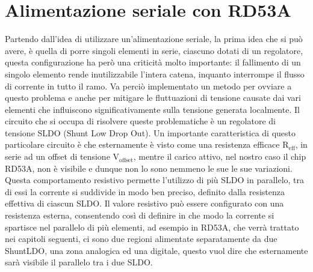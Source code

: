 \section{Alimentazione seriale con RD53A}
Partendo dall'idea di utilizzare un'alimentazione seriale, la prima idea che si può avere, è quella di porre singoli elementi in serie, ciascuno dotati di un regolatore, questa configurazione ha però una criticità molto importante: il fallimento di un singolo elemento rende inutilizzabile l'intera catena, inquanto interrompe il flusso di corrente in tutto il ramo. 
Va perciò implementato un metodo per ovviare a questo problema e anche per mitigare le fluttuazioni di tensione causate dai vari elementi che influiscono significativamente  sulla tensione generata localmente. Il circuito che si occupa di risolvere queste problematiche è un regolatore di tensione SLDO (Shunt Low Drop Out). 
% 
Un importante caratteristica di questo particolare circuito è che esternamente è visto come una resistenza efficace $\mathrm{R_{eff}}$, in serie ad un offset di tensione $\mathrm{V_{offset}}$, mentre il carico attivo, nel nostro caso il chip RD53A, non è visibile e dunque non lo sono nemmeno le sue le sue variazioni. 
Questa comportamento resistivo permette l'utilizzo di più SLDO in parallelo, tra di essi la corrente si suddivide in modo ben preciso, definito dalla resistenza effettiva di ciascun SLDO. 
Il valore resistivo può essere configurato con una resistenza esterna, consentendo così di definire in che modo la corrente si spartisce nel parallelo di più elementi, ad esempio in RD53A, che verrà trattato nei capitoli seguenti, ci sono due regioni alimentate separatamente da due ShuntLDO, una zona analogica ed una digitale, questo vuol dire che esternamente sarà visibile il parallelo tra i due SLDO. 
